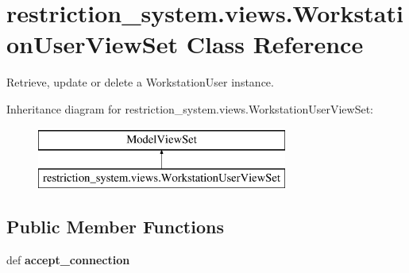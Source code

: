 \hypertarget{classrestriction__system_1_1views_1_1WorkstationUserViewSet}{}\section{restriction\+\_\+system.\+views.\+Workstation\+User\+View\+Set Class Reference}
\label{classrestriction__system_1_1views_1_1WorkstationUserViewSet}


Retrieve, update or delete a Workstation\+User instance.  


Inheritance diagram for restriction\+\_\+system.\+views.\+Workstation\+User\+View\+Set\+:\begin{figure}[H]
\begin{center}
\leavevmode
\includegraphics[height=2.000000cm]{classrestriction__system_1_1views_1_1WorkstationUserViewSet}
\end{center}
\end{figure}
\subsection*{Public Member Functions}
\begin{DoxyCompactItemize}
\item 
\hypertarget{classrestriction__system_1_1views_1_1WorkstationUserViewSet_a5a5ffd92311c93746239f0eef005648e}{}def {\bfseries accept\+\_\+connection}\label{classrestriction__system_1_1views_1_1WorkstationUserViewSet_a5a5ffd92311c93746239f0eef005648e}

\end{DoxyCompactItemize}
